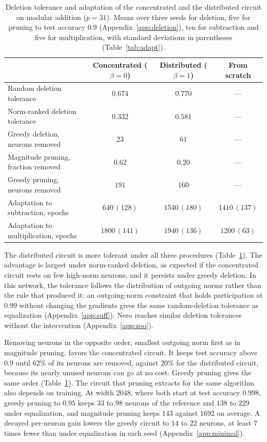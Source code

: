\documentclass{article} %
\begin{document}
\begin{table}[t]
\caption{Deletion tolerance and adaptation of the concentrated and the distributed circuit on modular addition ($p=31$). Means over three seeds for deletion, five for pruning to test accuracy $0.9$ (Appendix~\ref{app:deletion}), ten for subtraction and five for multiplication, with standard deviations in parentheses (Table~\ref{tab:adapt}).}
\label{tab:consequences}
\begin{center}
\footnotesize
\begin{tabular}{lccc}
\toprule
 & Concentrated ($\beta=0$) & Distributed ($\beta=1$) & From scratch \\
\midrule
Random deletion tolerance & $0.674$ & $0.770$ & --- \\
Norm-ranked deletion tolerance & $0.332$ & $0.581$ & --- \\
Greedy deletion, neurons removed & $23$ & $61$ & --- \\
Magnitude pruning, fraction removed & $0.62$ & $0.20$ & --- \\
Greedy pruning, neurons removed & $191$ & $160$ & --- \\
Adaptation to subtraction, epochs & $640\,(128)$ & $1540\,(180)$ & $1410\,(137)$ \\
Adaptation to multiplication, epochs & $1800\,(141)$ & $1940\,(136)$ & $1200\,(63)$ \\
\bottomrule
\end{tabular}
\end{center}
\end{table}

The distributed circuit is more tolerant under all three procedures (Table~\ref{tab:consequences}). The advantage is largest under norm-ranked deletion, as expected if the concentrated circuit rests on few high-norm neurons, and it persists under greedy deletion. In this network, the tolerance follows the distribution of outgoing norms rather than the rule that produced it: an outgoing-norm constraint that holds participation at $0.99$ without changing the gradients gives the same random-deletion tolerance as equalization (Appendix~\ref{app:suff}). Nero reaches similar deletion tolerances without the intervention (Appendix~\ref{app:zoo}).

Removing neurons in the opposite order, smallest outgoing norm first as in magnitude pruning, favors the concentrated circuit. It keeps test accuracy above $0.9$ until $62\%$ of its neurons are removed, against $20\%$ for the distributed circuit, because its nearly unused neurons can go at no cost. Greedy pruning gives the same order (Table~\ref{tab:consequences}). The circuit that pruning extracts for the same algorithm also depends on training. At width $2048$, where both start at test accuracy $0.998$, greedy pruning to $0.95$ keeps $33$ to $98$ neurons of the reference and $138$ to $229$ under equalization, and magnitude pruning keeps $143$ against $1692$ on average. A decayed per-neuron gain lowers the greedy circuit to $14$ to $22$ neurons, at least $7$ times fewer than under equalization in each seed (Appendix~\ref{app:minimal}).
\end{document}
